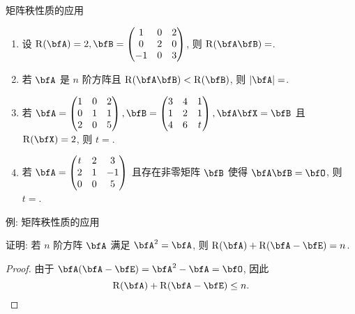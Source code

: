\begin{frame}{矩阵秩性质的应用}
	\onslide<+->
	\begin{exercise}
		\begin{enumerate}
			\item 设 $\rank(\bfA)=2,\bfB=\begin{pmatrix}
				1&0&2\\
				0&2&0\\
				-1&0&3
			\end{pmatrix}$, 则 $\rank(\bfA\bfB)=$.
			\item 若 $\bfA$ 是 $n$ 阶方阵且 $\rank(\bfA\bfB)<\rank(\bfB)$, 则 $|\bfA|=$.
			\item 若 $\bfA=\begin{pmatrix}
				1&0&2\\
				0&1&1\\
				2&0&5
			\end{pmatrix},\bfB=\begin{pmatrix}
				3&4&1\\
				1&2&1\\
				4&6&t
			\end{pmatrix},\bfA\bfX=\bfB$ 且 $\rank(\bfX)=2$, 则 $t=$.
			\item 若 $\bfA=\begin{pmatrix}
				t&2&3\\
				2&1&-1\\
				0&0&5
			\end{pmatrix}$ 且存在非零矩阵 $\bfB$ 使得 $\bfA\bfB=\bfO$, 则 $t=$.
		\end{enumerate}
	\end{exercise}
\end{frame}


\begin{frame}{例: 矩阵秩性质的应用}
	\onslide<+->
	\begin{example}
		证明: 若 $n$ 阶方阵 $\bfA$ 满足 $\bfA^2=\bfA$, 则 $\rank(\bfA)+\rank(\bfA-\bfE)=n$.
	\end{example}
	\onslide<+->
	\begin{proof}
		由于 $\bfA(\bfA-\bfE)=\bfA^2-\bfA=\bfO$, 因此
		\[\rank(\bfA)+\rank(\bfA-\bfE)\le n.\]
		\onslide<+->{%
			故 $\rank(\bfA)+\rank(\bfA-\bfE)=n$.\qedhere
		}
	\end{proof}
\end{frame}


